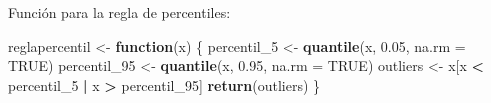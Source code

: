\documentclass[
]{article}
\newenvironment{Shaded}{\begin{snugshade}}{\end{snugshade}}
\newcommand{\AttributeTok}[1]{\textcolor[rgb]{0.13,0.29,0.53}{#1}}
\newcommand{\ConstantTok}[1]{\textcolor[rgb]{0.56,0.35,0.01}{#1}}
\newcommand{\ControlFlowTok}[1]{\textcolor[rgb]{0.13,0.29,0.53}{\textbf{#1}}}
\newcommand{\FloatTok}[1]{\textcolor[rgb]{0.00,0.00,0.81}{#1}}
\newcommand{\FunctionTok}[1]{\textcolor[rgb]{0.13,0.29,0.53}{\textbf{#1}}}
\newcommand{\NormalTok}[1]{#1}
\newcommand{\OtherTok}[1]{\textcolor[rgb]{0.56,0.35,0.01}{#1}}
\newcommand{\SpecialCharTok}[1]{\textcolor[rgb]{0.81,0.36,0.00}{\textbf{#1}}}
\begin{document}
Función para la regla de percentiles:

\begin{Shaded}
\begin{Highlighting}[]
\NormalTok{reglapercentil }\OtherTok{\textless{}{-}} \ControlFlowTok{function}\NormalTok{(x) \{}
\NormalTok{  percentil\_5 }\OtherTok{\textless{}{-}} \FunctionTok{quantile}\NormalTok{(x, }\FloatTok{0.05}\NormalTok{, }\AttributeTok{na.rm =} \ConstantTok{TRUE}\NormalTok{)}
\NormalTok{  percentil\_95 }\OtherTok{\textless{}{-}} \FunctionTok{quantile}\NormalTok{(x, }\FloatTok{0.95}\NormalTok{, }\AttributeTok{na.rm =} \ConstantTok{TRUE}\NormalTok{)}
\NormalTok{  outliers }\OtherTok{\textless{}{-}}\NormalTok{ x[x }\SpecialCharTok{\textless{}}\NormalTok{ percentil\_5 }\SpecialCharTok{|}\NormalTok{ x }\SpecialCharTok{\textgreater{}}\NormalTok{ percentil\_95]}
  \FunctionTok{return}\NormalTok{(outliers)}
\NormalTok{\}}
\end{Highlighting}
\end{Shaded}
\end{document}
